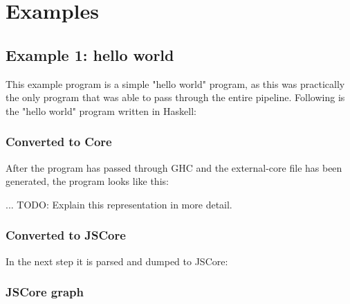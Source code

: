 
\section{Examples}

\lstset{ %
frame=single,                   %
tabsize=2,                      %
captionpos=b,                   %
breaklines=true,                %
}

\subsection{Example 1: hello world}

This example program is a simple "hello world" program, as this was practically
the only program that was able to pass through the entire pipeline. Following
is the "hello world" program written in Haskell:

\begin{footnotesize}

\end{footnotesize}

\subsubsection{Converted to Core}

After the program has passed through GHC and the external-core file
has been generated, the program looks like this:

\begin{footnotesize}

\end{footnotesize}

... TODO: Explain this representation in more detail.

\subsubsection{Converted to JSCore}

In the next step it is parsed and dumped to JSCore:

\begin{footnotesize}

\end{footnotesize}

\subsubsection{JSCore graph}

